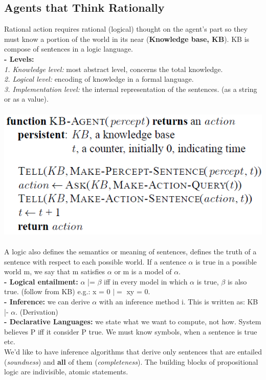 \documentclass{article}
\begin{document}
\subsection{Agents that Think Rationally}
Rational action requires rational (logical) thought on the agent's part so they must know a portion of the world in its near (\textbf{Knowledge base, KB}). KB is compose of sentences in a logic language.\\
\textbf{- Levels: }\\
\textit{1. Knowledge level: }most abstract level, concerns the total knowledge.\\
\textit{2. Logical level: }encoding of knowledge in a formal language.\\
\textit{3. Implementation level: }the internal representation of the sentences. (as a string or as a value).\\\\
\includegraphics[scale=0.6]{29.png}\\\\
A logic also defines the semantics or meaning of sentences, defines the truth of a sentence with respect to each possible world. If a sentence $\alpha$ is true in a possible world m, we say that m satisfies $\alpha$ or m is a model of $\alpha$.\\
\textbf{- Logical entailment: }$\alpha$ |= $\beta$ iff in every model in which $\alpha$ is true, $\beta$ is also true. (follow from KB) e.g.: x = 0 $|=$ xy = 0.\\
\textbf{- Inference: }we can derive $\alpha$ with an inference method i. This is written as: KB |- $\alpha$. (Derivation)\\
\textbf{- Declarative Languages: }we state what we want to compute, not how. System believes P iff it consider P true. We must know symbols, when a sentence is true etc.\\
We'd like to have inference algorithms that derive only sentences that are entailed (\textit{soundness}) and \textbf{all} of them (\textit{completeness}).
The building blocks of propositional logic are indivisible, atomic statements.\\
\end{document}
